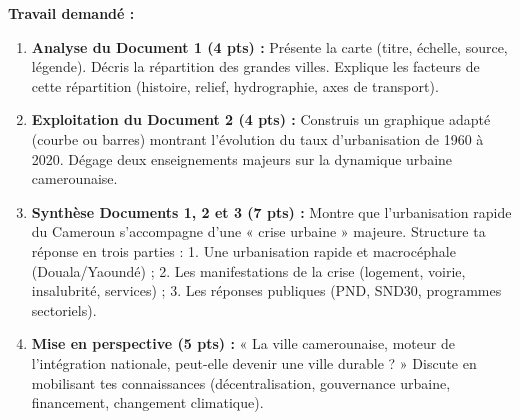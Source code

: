 \documentclass[11pt]{article}
\begin{document}
\begin{exercice}
\textbf{Travail demandé :}
\begin{enumerate}
    \item \textbf{Analyse du Document 1 (4 pts) :} Présente la carte (titre, échelle, source, légende). Décris la répartition des grandes villes. Explique les facteurs de cette répartition (histoire, relief, hydrographie, axes de transport).
    \item \textbf{Exploitation du Document 2 (4 pts) :} Construis un graphique adapté (courbe ou barres) montrant l'évolution du taux d'urbanisation de 1960 à 2020. Dégage deux enseignements majeurs sur la dynamique urbaine camerounaise.
    \item \textbf{Synthèse Documents 1, 2 et 3 (7 pts) :} Montre que l'urbanisation rapide du Cameroun s'accompagne d'une « crise urbaine » majeure. Structure ta réponse en trois parties : 1. Une urbanisation rapide et macrocéphale (Douala/Yaoundé) ; 2. Les manifestations de la crise (logement, voirie, insalubrité, services) ; 3. Les réponses publiques (PND, SND30, programmes sectoriels).
    \item \textbf{Mise en perspective (5 pts) :} « La ville camerounaise, moteur de l'intégration nationale, peut-elle devenir une ville durable ? » Discute en mobilisant tes connaissances (décentralisation, gouvernance urbaine, financement, changement climatique).
\end{enumerate}
\end{exercice}
\end{document}
